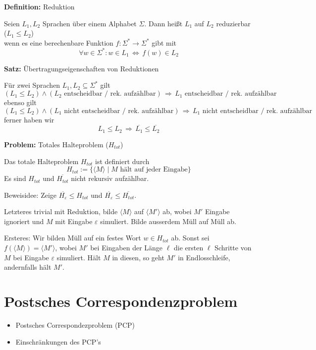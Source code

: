 \documentclass[a4paper,graphics,11pt]{article}
\newcommand{\eps}[0]{\varepsilon}
\newcommand{\godel}[1]{\langle #1 \rangle}
\newcommand{\Iff}[0]{\,\Longleftrightarrow\,}
\begin{document}
\strut

\textbf{Definition:} Reduktion

Seien $L_1,L_2$ Sprachen über einem Alphabet $\Sigma$. Dann heißt $L_1$ auf $L_2$ reduzierbar ($L_1 \leq L_2$)\\
wenn es eine berechenbare Funktion $f : \Sigma^* \to \Sigma^*$ gibt mit
$$
    \forall w \in \Sigma^* : w \in L_1 \Iff f(w) \in L_2
$$

\strut

\textbf{Satz:} Übertragungseigenschaften von Reduktionen

Für zwei Sprachen $L_1,L_2 \subseteq \Sigma^*$ gilt
$$
    (L_1 \leq L_2) \land (L_2 \text{ entscheidbar / rek. aufzählbar})
    \,\Longrightarrow\, L_1 \text{ entscheidbar / rek. aufzählbar}
$$
ebenso gilt
$$
    (L_1 \leq L_2) \land (L_1 \text{ nicht entscheidbar / rek. aufzählbar})
    \,\Longrightarrow\, L_1 \text{ nicht entscheidbar / rek. aufzählbar}
$$
ferner haben wir
$$
    L_1 \leq L_2 \,\Longrightarrow\, \overline{L_1} \leq \overline{L_2}
$$

\strut

\textbf{Problem:} Totales Halteproblem ($H_{tot}$)

Das totale Halteproblem $H_{tot}$ ist definiert durch
$$
    H_{tot} := \{\godel{M} \mid M \text{ hält auf jeder Eingabe} \}
$$
Es sind $H_{tot}$ und $\overline{H_{tot}}$ nicht rekursiv aufzählbar.

Beweisidee: Zeige $\overline{H_\eps} \leq H_{tot}$ und $\overline{H_\eps} \leq \overline{H_{tot}}$.

Letzteres trivial mit Reduktion, bilde $\godel{M}$ auf $\godel{M'}$ ab, wobei $M'$ Eingabe ignoriert
und $M$ mit Eingabe $\eps$ simuliert. Bilde ausserdem Müll auf Müll ab.

Ersteres:
Wir bilden Müll auf ein festes Wort $w \in H_{tot}$ ab. Sonst sei $f(\godel{M}) = \godel{M'}$,
wobei $M'$ bei Eingaben der Länge $\ell$ die ersten $\ell$ Schritte von $M$ bei Eingabe $\eps$ simuliert.
Hält $M$ in diesen, so geht $M'$ in Endlosschleife, andernfalls hält $M'$.

\newpage

\section{Postsches Correspondenzproblem}


\begin{itemize}
    \item Postsches Correspondezproblem (PCP)
    \item Einschränkungen des PCP's
\end{itemize}
\end{document}
